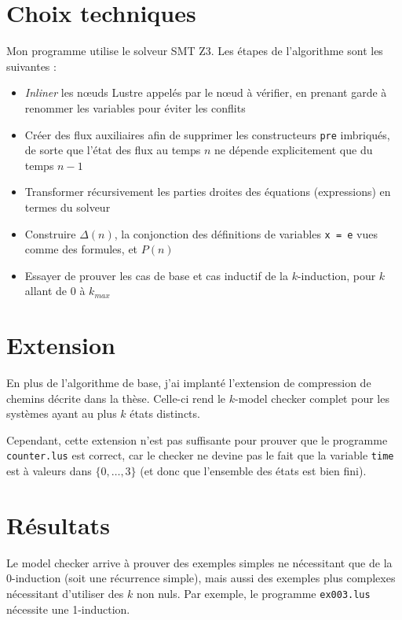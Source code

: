 \documentclass[a4paper]{article}
\begin{document}
\section{Choix techniques}

Mon programme utilise le solveur SMT Z3.
Les étapes de l'algorithme sont les suivantes :
\begin{itemize}
\item \emph{Inliner} les nœuds Lustre appelés par le nœud à vérifier, en prenant garde à renommer les variables pour éviter les conflits
\item Créer des flux auxiliaires afin de supprimer les constructeurs \texttt{pre} imbriqués, de sorte que l'état des flux au temps $n$ ne dépende explicitement que du temps $n-1$
\item Transformer récursivement les parties droites des équations (expressions) en termes du solveur
\item Construire $\Delta(n)$, la conjonction des définitions de variables \texttt{x = e} vues comme des formules, et $P(n)$
\item Essayer de prouver les cas de base et cas inductif de la $k$-induction, pour $k$ allant de 0 à $k_{max}$
\end{itemize}

\pagebreak

\section{Extension}

En plus de l'algorithme de base, j'ai implanté l'extension de compression de chemins décrite dans la thèse.
Celle-ci rend le $k$-model checker complet pour les systèmes ayant au plus $k$ états distincts.

Cependant, cette extension n'est pas suffisante pour prouver que le programme \texttt{counter.lus} est correct, car le checker ne devine pas le fait que la variable \texttt{time} est à valeurs dans $\{0, \ldots, 3\}$ (et donc que l'ensemble des états est bien fini).

\section{Résultats}

Le model checker arrive à prouver des exemples simples ne nécessitant que de la 0-induction (soit une récurrence simple), mais aussi des exemples plus complexes nécessitant d'utiliser des $k$ non nuls.
Par exemple, le programme \texttt{ex003.lus} nécessite une 1-induction.
\end{document}
